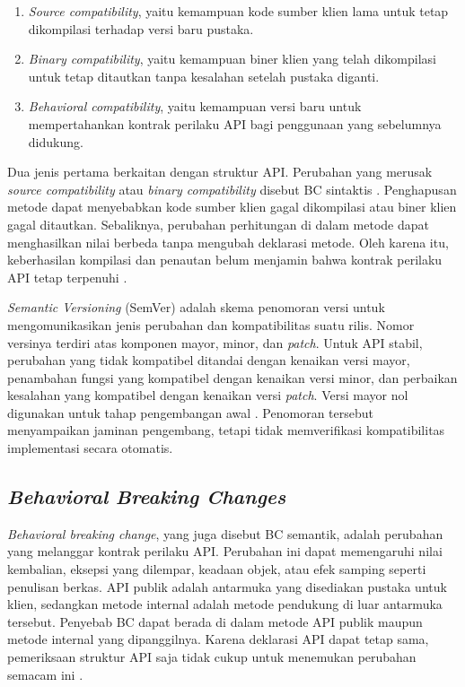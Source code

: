 \begin{enumerate}
    \item \textit{Source compatibility}, yaitu kemampuan kode sumber klien lama untuk tetap dikompilasi terhadap versi baru pustaka.
    \item \textit{Binary compatibility}, yaitu kemampuan biner klien yang telah dikompilasi untuk tetap ditautkan tanpa kesalahan setelah pustaka diganti.
    \item \textit{Behavioral compatibility}, yaitu kemampuan versi baru untuk mempertahankan kontrak perilaku API bagi penggunaan yang sebelumnya didukung.
\end{enumerate}

Dua jenis pertama berkaitan dengan struktur API\@. Perubahan yang merusak \textit{source compatibility} atau \textit{binary compatibility} disebut BC sintaktis \parencite{Ochoa2023}. Penghapusan metode dapat menyebabkan kode sumber klien gagal dikompilasi atau biner klien gagal ditautkan. Sebaliknya, perubahan perhitungan di dalam metode dapat menghasilkan nilai berbeda tanpa mengubah deklarasi metode. Oleh karena itu, keberhasilan kompilasi dan penautan belum menjamin bahwa kontrak perilaku API tetap terpenuhi \parencite{JLS25Chapter13}.

\textit{Semantic Versioning} (SemVer) adalah skema penomoran versi untuk mengomunikasikan jenis perubahan dan kompatibilitas suatu rilis. Nomor versinya terdiri atas komponen mayor, minor, dan \textit{patch}. Untuk API stabil, perubahan yang tidak kompatibel ditandai dengan kenaikan versi mayor, penambahan fungsi yang kompatibel dengan kenaikan versi minor, dan perbaikan kesalahan yang kompatibel dengan kenaikan versi \textit{patch}. Versi mayor nol digunakan untuk tahap pengembangan awal \parencite{SemVer200}. Penomoran tersebut menyampaikan jaminan pengembang, tetapi tidak memverifikasi kompatibilitas implementasi secara otomatis.

\subsection{\textit{Behavioral Breaking Changes}}
\label{subsec:behavioral-bc}

\textit{Behavioral breaking change}, yang juga disebut BC semantik, adalah perubahan yang melanggar kontrak perilaku API\@. Perubahan ini dapat memengaruhi nilai kembalian, eksepsi yang dilempar, keadaan objek, atau efek samping seperti penulisan berkas. API publik adalah antarmuka yang disediakan pustaka untuk klien, sedangkan metode internal adalah metode pendukung di luar antarmuka tersebut. Penyebab BC dapat berada di dalam metode API publik maupun metode internal yang dipanggilnya. Karena deklarasi API dapat tetap sama, pemeriksaan struktur API saja tidak cukup untuk menemukan perubahan semacam ini \parencite{Ochoa2023}.

